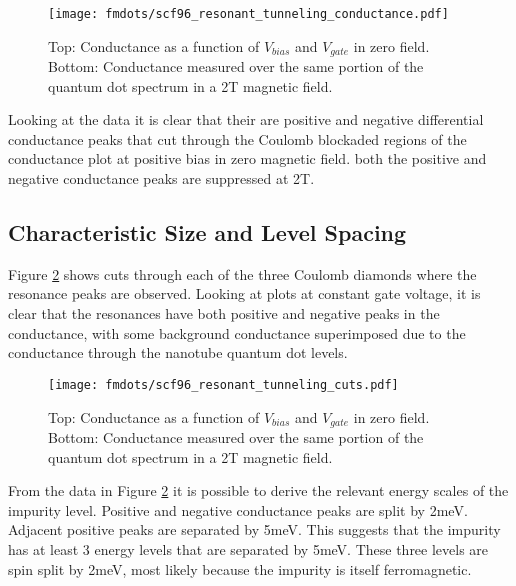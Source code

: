 \begin{figure}
    \centering
    \texttt{[image: fmdots/scf96\_resonant\_tunneling\_conductance.pdf]}
    \caption{Top: Conductance as a function of $V_{bias}$ and $V_{gate}$ in zero field. Bottom: Conductance measured over the same portion of the quantum dot spectrum in a 2T magnetic field.}
    \label{fig:resonant_tunneling}
\end{figure}

Looking at the data it is clear that their are positive and negative differential conductance peaks that cut through the Coulomb blockaded regions of the conductance plot at positive bias in zero magnetic field. both the positive and negative conductance peaks are suppressed at 2T.

\subsection{Characteristic Size and Level Spacing}

Figure \ref{fig:resonance_cuts} shows cuts through each of the three Coulomb diamonds where the resonance peaks are observed. Looking at plots at constant gate voltage, it is clear that the resonances have both positive and negative peaks in the conductance, with some background conductance superimposed due to the conductance through the nanotube quantum dot levels.

\begin{figure}
    \centering
    \texttt{[image: fmdots/scf96\_resonant\_tunneling\_cuts.pdf]}
    \caption{Top: Conductance as a function of $V_{bias}$ and $V_{gate}$ in zero field. Bottom: Conductance measured over the same portion of the quantum dot spectrum in a 2T magnetic field.}
    \label{fig:resonance_cuts}
\end{figure}

From the data in Figure \ref{fig:resonance_cuts} it is possible to derive the relevant energy scales of the impurity level. Positive and negative conductance peaks are split by 2meV. Adjacent positive peaks are separated by 5meV. This suggests that the impurity has at least 3 energy levels that are separated by 5meV. These three levels are spin split by 2meV, most likely because the impurity is itself ferromagnetic.


